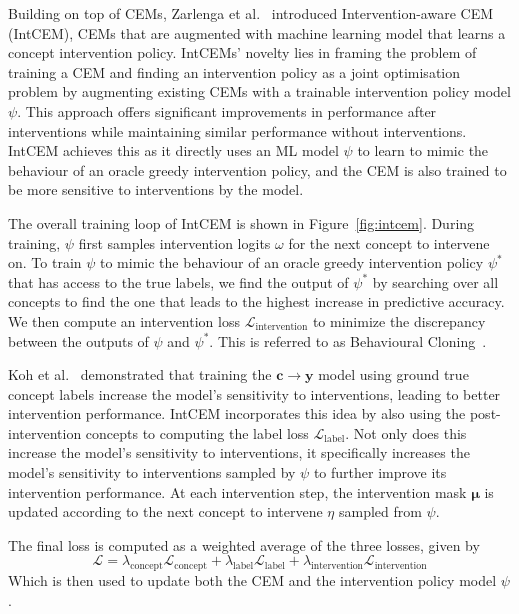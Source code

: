 Building on top of CEMs, Zarlenga et al.~\cite{intcem} introduced 
Intervention-aware CEM (IntCEM), CEMs that are augmented
with machine learning model
that learns a concept intervention policy. IntCEMs' novelty
lies in framing the problem of training a CEM and finding
an intervention policy as a joint optimisation problem by augmenting
existing CEMs with a trainable intervention policy model $\psi$. 
This approach offers significant improvements in performance after 
interventions while maintaining similar performance without 
interventions. 
IntCEM achieves this as it directly uses an ML
model $\psi$ to
learn to mimic the behaviour of an oracle
greedy intervention policy, 
and the CEM is also trained to be more sensitive to interventions
by the model. 


The overall training loop of IntCEM 
is shown in Figure~\ref{fig:intcem}.
During training, $\psi$ first samples intervention
logits $\omega$ for the next concept to intervene on.
To train $\psi$ to mimic 
the behaviour of an oracle 
greedy intervention policy $\psi^*$ that has access to the true
labels, we find the output of $\psi^*$
by searching over all concepts to find the one that 
leads to the highest increase in predictive accuracy.
We then compute an intervention loss $\mathcal{L}_{\text{intervention}}$ to minimize the discrepancy between the outputs of $\psi$ and $\psi^*$.
This is referred to as Behavioural
Cloning~\cite{behavioural-cloning}.

Koh et al.~\cite{cbm} demonstrated that
training the $\mathbf{c} \to \mathbf{y}$ model using ground
true concept labels increase the model's sensitivity
to interventions,
leading to better intervention performance.
IntCEM incorporates this idea by 
also using 
the post-intervention concepts to
computing the label loss $\mathcal{L}_{\text{label}}$.
Not only does this increase the model's sensitivity to interventions,
it specifically increases the model's sensitivity to interventions
sampled by $\psi$ to further improve its intervention performance. At each intervention step,
the intervention mask $\bm{\mu}$ is updated according to 
the next concept to intervene $\eta$ sampled from $\psi$.

The final loss is computed as a weighted average of the three losses,
given by 
\[\mathcal{L} = \lambda_{\text{concept}} \mathcal{L}_{\text{concept}}
+  \lambda_{\text{label}} \mathcal{L}_{\text{label}}
+  \lambda_{\text{intervention}} \mathcal{L}_{\text{intervention}}\]
Which is then used to update both the CEM and the intervention policy model $\psi$.

